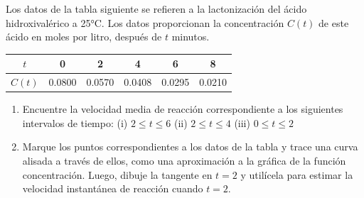 \item Los datos de la tabla siguiente se refieren a la lactonización del ácido hidroxivalérico a 25°C. Los datos proporcionan la concentración $C(t)$ de este ácido en moles por litro, después de $t$ minutos.

\begin{center}
\begin{tabular}{|c|c|c|c|c|c|}
\hline
$t$ & 0 & 2 & 4 & 6 & 8 \\
\hline
$C(t)$ & 0.0800 & 0.0570 & 0.0408 & 0.0295 & 0.0210 \\
\hline
\end{tabular}
\end{center}

\begin{enumerate}
    \item[(a)] Encuentre la velocidad media de reacción correspondiente a los siguientes intervalos de tiempo:
    (i) $2 \le t \le 6$ \quad (ii) $2 \le t \le 4$ \quad (iii) $0 \le t \le 2$
    \item[(b)] Marque los puntos correspondientes a los datos de la tabla y trace una curva alisada a través de ellos, como una aproximación a la gráfica de la función concentración. Luego, dibuje la tangente en $t = 2$ y utilícela para estimar la velocidad instantánea de reacción cuando $t = 2$.
\end{enumerate}
